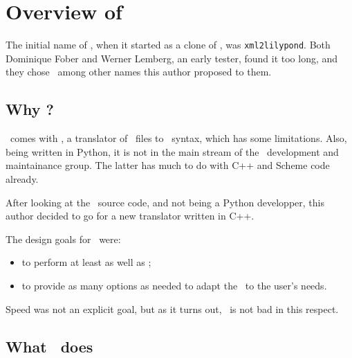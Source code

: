 \documentclass[12pt,a4paper]{article}
\begin{document}
\section{Overview of \xmlToLy\ }

The initial name of \xmlToLy, when it started as a clone of \xmlToGuido, was {\tt xml2lilypond}. Both Dominique Fober and Werner Lemberg, an early tester, found it too long, and they chose \xmlToLy\ among other names this author proposed to them.

\subsection{Why \xmlToLy?}

\lily\ comes with \mxmlToLy, a translator of \mxml\ files to \lily\ syntax, which has some limitations. Also, being written in Python, it is not in the main stream of the \lily\ development and maintainance group. The latter has much to do with C++ and Scheme code already.

After looking at the \mxmlToLy\ source code, and not being a Python developper, this author decided to go for a new translator written in C++.

The design goals for \xmlToLy\ were:
\begin{itemize}
\item to perform at least as well as \mxmlToLy;
\item to provide as many options as needed to adapt the \lcg\ to the user's needs.
\end{itemize}

Speed was not an explicit goal, but as it turns out, \xmlToLy\ is not bad in this respect.

\subsection{What \xmlToLy\ does}
\end{document}
